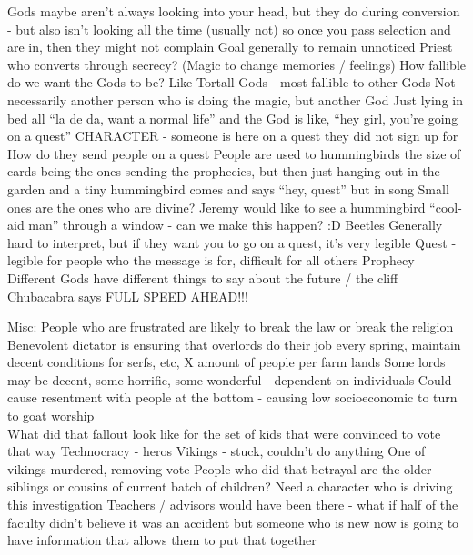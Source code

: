 \documentclass[blue]{GL2020}
\begin{document}
Gods maybe aren’t always looking into your head, but they do during conversion - but also isn’t looking all the time (usually not) so once you pass selection and are in, then they might not complain
Goal generally to remain unnoticed
Priest who converts through secrecy?  (Magic to change memories / feelings)
How fallible do we want the Gods to be?
Like Tortall Gods - most fallible to other Gods
Not necessarily another person who is doing the magic, but another God
Just lying in bed all “la de da, want a normal life” and the God is like, “hey girl, you’re going on a quest”
CHARACTER - someone is here on a quest they did not sign up for
How do they send people on a quest
People are used to hummingbirds the size of cards being the ones sending the prophecies, but then just hanging out in the garden and a tiny hummingbird comes and says “hey, quest” but in song
Small ones are the ones who are divine?
Jeremy would like to see a hummingbird “cool-aid man” through a window - can we make this happen? :D
Beetles
Generally hard to interpret, but if they want you to go on a quest, it’s very legible
Quest - legible for people who the message is for, difficult for all others
Prophecy
Different Gods have different things to say about the future / the cliff
Chubacabra says FULL SPEED AHEAD!!!

Misc:
People who are frustrated are likely to break the law or break the religion
Benevolent dictator is ensuring that overlords do their job every spring, maintain decent conditions for serfs, etc, X amount of people per farm lands
Some lords may be decent, some horrific, some wonderful - dependent on individuals
Could cause resentment with people at the bottom - causing low socioeconomic to turn to goat worship\\
 
What did that fallout look like for the set of kids that were convinced to vote that way
Technocracy - heros
Vikings - stuck, couldn’t do anything
One of vikings murdered, removing vote
People who did that betrayal are the older siblings or cousins of current batch of children?
Need a character who is driving this investigation
Teachers / advisors would have been there - what if half of the faculty didn’t believe it was an accident but someone who is new now is going to have information that allows them to put that together
\end{document}
